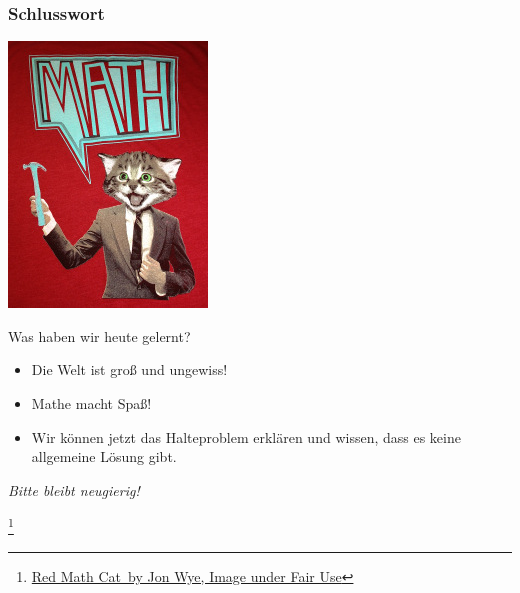 \documentclass[aspectratio=169]{beamer}
\newcommand\blfootnote[1]{%
  \begingroup
  \renewcommand\thefootnote{}\footnote{#1}%
  \addtocounter{footnote}{-1}%
  \endgroup
}
\begin{document}
\begin{frame}
\frametitle{Schlusswort}

\begin{multicols}{2}

\includegraphics[scale=0.7]{images/red_math_cat.jpg} 

\columnbreak

Was haben wir heute gelernt?

\begin{itemize}
\pause\item Die Welt ist groß und ungewiss!
\pause\item Mathe macht Spaß!
\pause\item Wir können jetzt das Halteproblem erklären und wissen, dass es keine allgemeine Lösung gibt.
\end{itemize}
\pause\bigskip

\begin{center}
\Large \emph{Bitte bleibt neugierig!}

\end{center}
\end{multicols}

\blfootnote{\href{https://jonwye.com/t-shirts/math-cat-t-shirt-men.html}{\glqq Red Math Cat\grqq\ by Jon Wye, Image under Fair Use}}
\end{frame}
\end{document}
